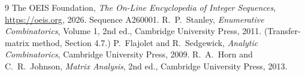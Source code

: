 \documentclass[11pt,a4paper]{article}
\theoremstyle{plain}
\theoremstyle{definition}
\begin{document}
\begin{thebibliography}{9}
 The OEIS Foundation, \emph{The On-Line Encyclopedia of Integer
Sequences}, \url{https://oeis.org}, 2026. Sequence A260001.
 R.~P.~Stanley, \emph{Enumerative Combinatorics}, Volume 1, 2nd ed.,
Cambridge University Press, 2011. (Transfer-matrix method, Section 4.7.)
 P.~Flajolet and R.~Sedgewick, \emph{Analytic Combinatorics}, Cambridge
University Press, 2009.
 R.~A.~Horn and C.~R.~Johnson, \emph{Matrix Analysis}, 2nd ed., Cambridge
University Press, 2013.
\end{thebibliography}
\end{document}
